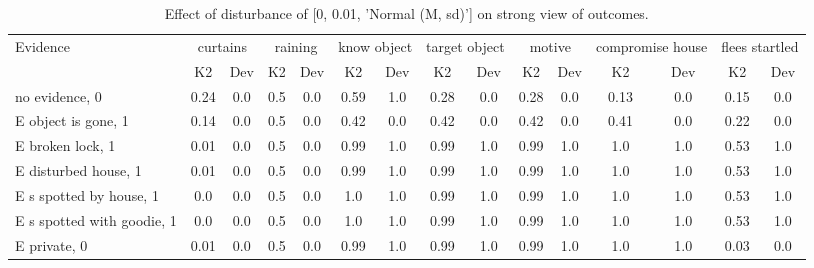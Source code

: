 \begin{table}\begin{tabular}{l|cc|cc|cc|cc|cc|cc|cc}\toprule\multirow{2}{*}{Evidence} & \multicolumn{2}{c}{curtains}& \multicolumn{2}{c}{raining}& \multicolumn{2}{c}{know object}& \multicolumn{2}{c}{target object}& \multicolumn{2}{c}{motive}& \multicolumn{2}{c}{compromise house}& \multicolumn{2}{c}{flees startled}\\& {K2} & {Dev}& {K2} & {Dev}& {K2} & {Dev}& {K2} & {Dev}& {K2} & {Dev}& {K2} & {Dev}& {K2} & {Dev}\\\midrule
no evidence, 0 & \cellcolor{Bittersweet}0.24&\cellcolor{Bittersweet}0.0&0.5&0.0&0.59&1.0&\cellcolor{Bittersweet}0.28&\cellcolor{Bittersweet}0.0&\cellcolor{Bittersweet}0.28&\cellcolor{Bittersweet}0.0&\cellcolor{Bittersweet}0.13&\cellcolor{Bittersweet}0.0&\cellcolor{Bittersweet}0.15&\cellcolor{Bittersweet}0.0\\E object is gone, 1 & \cellcolor{Bittersweet}0.14&\cellcolor{Bittersweet}0.0&0.5&0.0&0.42&0.0&0.42&0.0&0.42&0.0&0.41&0.0&\cellcolor{Bittersweet}0.22&\cellcolor{Bittersweet}0.0\\E broken lock, 1 & \cellcolor{Bittersweet}0.01&\cellcolor{Bittersweet}0.0&0.5&0.0&\cellcolor{Bittersweet}0.99&\cellcolor{Bittersweet}1.0&\cellcolor{Bittersweet}0.99&\cellcolor{Bittersweet}1.0&\cellcolor{Bittersweet}0.99&\cellcolor{Bittersweet}1.0&\cellcolor{Bittersweet}1.0&\cellcolor{Bittersweet}1.0&0.53&1.0\\E disturbed house, 1 & \cellcolor{Bittersweet}0.01&\cellcolor{Bittersweet}0.0&0.5&0.0&\cellcolor{Bittersweet}0.99&\cellcolor{Bittersweet}1.0&\cellcolor{Bittersweet}0.99&\cellcolor{Bittersweet}1.0&\cellcolor{Bittersweet}0.99&\cellcolor{Bittersweet}1.0&\cellcolor{Bittersweet}1.0&\cellcolor{Bittersweet}1.0&0.53&1.0\\E s spotted by house, 1 & \cellcolor{Bittersweet}0.0&\cellcolor{Bittersweet}0.0&0.5&0.0&\cellcolor{Bittersweet}1.0&\cellcolor{Bittersweet}1.0&\cellcolor{Bittersweet}0.99&\cellcolor{Bittersweet}1.0&\cellcolor{Bittersweet}0.99&\cellcolor{Bittersweet}1.0&\cellcolor{Bittersweet}1.0&\cellcolor{Bittersweet}1.0&0.53&1.0\\E s spotted with goodie, 1 & \cellcolor{Bittersweet}0.0&\cellcolor{Bittersweet}0.0&0.5&0.0&\cellcolor{Bittersweet}1.0&\cellcolor{Bittersweet}1.0&\cellcolor{Bittersweet}0.99&\cellcolor{Bittersweet}1.0&\cellcolor{Bittersweet}0.99&\cellcolor{Bittersweet}1.0&\cellcolor{Bittersweet}1.0&\cellcolor{Bittersweet}1.0&0.53&1.0\\E private, 0 & \cellcolor{Bittersweet}0.01&\cellcolor{Bittersweet}0.0&0.5&0.0&\cellcolor{Bittersweet}0.99&\cellcolor{Bittersweet}1.0&\cellcolor{Bittersweet}0.99&\cellcolor{Bittersweet}1.0&\cellcolor{Bittersweet}0.99&\cellcolor{Bittersweet}1.0&\cellcolor{Bittersweet}1.0&\cellcolor{Bittersweet}1.0&\cellcolor{Bittersweet}0.03&\cellcolor{Bittersweet}0.0\\\bottomrule\end{tabular}\caption{Effect of disturbance of [0, 0.01, 'Normal (M, sd)'] on strong view of outcomes.}\end{table}